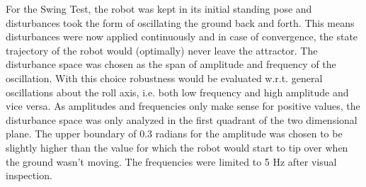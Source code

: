     For the Swing Test, the robot was kept in its initial standing pose and disturbances took the form of oscillating the ground back and forth. This means disturbances were now applied continuously and in case of convergence, the state trajectory of the robot would (optimally) never leave the attractor. The disturbance space was chosen as the span of amplitude and frequency of the oscillation. With this choice robustness would be evaluated w.r.t. general oscillations about the roll axis, i.e. both low frequency and high amplitude and vice versa. As amplitudes and frequencies only make sense for positive values, the disturbance space was only analyzed in the first quadrant of the two dimensional plane. The upper boundary of $0.3$ radians for the amplitude was chosen to be slightly higher than the value for which the robot would start to tip over when the ground wasn't moving. The frequencies were limited to 5 Hz after visual inspection. 
